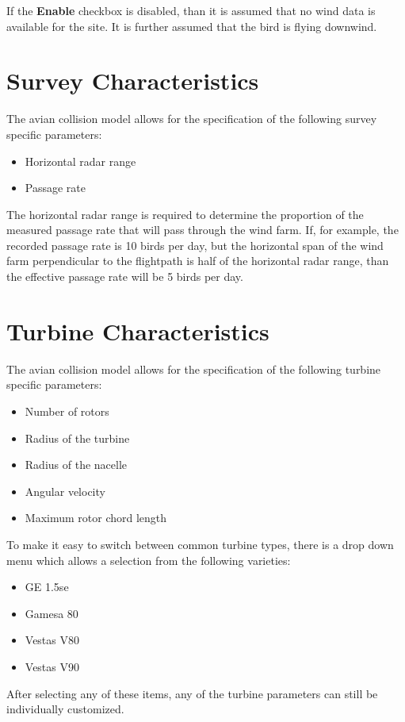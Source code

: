 \documentclass[11pt,letterpaper,openany]{report}
\begin{document}
If the \textbf{Enable} checkbox is disabled, than it is assumed that no wind data is available for the site. It is
further assumed that the bird is flying downwind.

\section{Survey Characteristics}
The avian collision model allows for the specification of the following survey specific parameters:
\begin{itemize}
  \item Horizontal radar range
  \item Passage rate
\end{itemize}
The horizontal radar range is required to determine the proportion of the measured passage rate that will pass through
the wind farm. If, for example, the recorded passage rate is 10 birds per day, but the horizontal span of the wind farm
perpendicular to the flightpath is half of the horizontal radar range, than the effective passage rate will be 5 birds
per day.

\section{Turbine Characteristics}
The avian collision model allows for the specification of the following turbine specific parameters:
\begin{itemize}
  \item Number of rotors
  \item Radius of the turbine
  \item Radius of the nacelle
  \item Angular velocity
  \item Maximum rotor chord length
\end{itemize}

To make it easy to switch between common turbine types, there is a drop down menu which allows a selection from the
following varieties:
\begin{itemize}
  \item GE 1.5se
  \item Gamesa 80
  \item Vestas V80
  \item Vestas V90
\end{itemize}
After selecting any of these items, any of the turbine parameters can still be individually customized.
\end{document}
